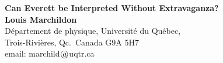 \documentclass[12pt]{article}
\begin{document}
%
%
\begin{center}
\LARGE
\textbf{Can Everett be Interpreted Without
Extravaganza?}\\[1cm]
\large
\textbf{Louis Marchildon}\\[0.5cm]
\normalsize
D\'{e}partement de physique,
Universit\'{e} du Qu\'{e}bec,\\
Trois-Rivi\`{e}res, Qc.\ Canada G9A 5H7\\
email: marchild$\hspace{0.3em}a\hspace{-0.8em}
\bigcirc$uqtr.ca\\
\end{center}
%
\medskip
%
%
%
\begin{comment}
\title{Can Everett be Interpreted Without Extravaganza?}

\author{Louis Marchildon}

\institute{L. Marchildon \at
              D\'{e}partement de physique,
              Universit\'{e} du Qu\'{e}bec,
              Trois-Rivi\`{e}res, Canada G9A~5H7\\
              Tel.: 819-376-5107\\
              Fax: 819-376-5164\\
              \email{louis.marchildon@uqtr.ca}}

\date{Received: date / Accepted: date}

\maketitle
\end{comment}
%
\begin{abstract}
Everett's relative states interpretation of
quantum mechanics has met with problems related
to probability, the preferred basis, and
multiplicity.  The third theme, I argue, is the most
important one.  It has led to developments of the
original approach into many-worlds, many-minds,
and decoherence-based approaches.
The latter especially have been advocated in recent
years, in an effort to understand multiplicity
without resorting to what is often perceived
as extravagant constructions.  Drawing from and
adding to arguments of others,
I show that proponents of decoherence-based
approaches have not yet succeeded in making
their ontology clear.
\end{abstract}
%
\end{document}
